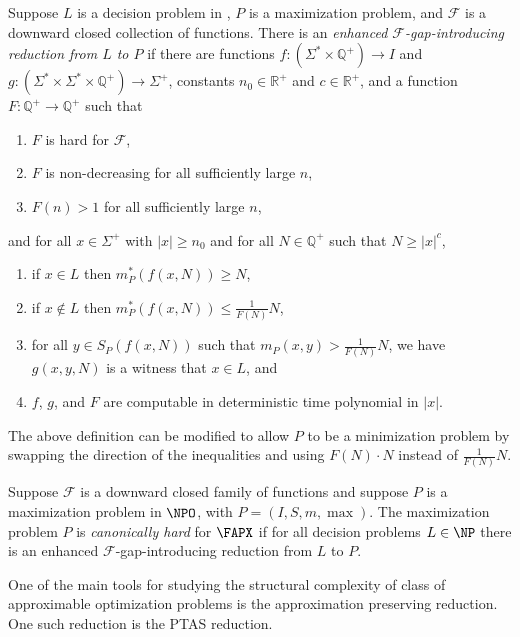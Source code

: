 \documentclass{article}
\begin{document}
\begin{definition}\label{def:gapintroducing}
  Suppose $L$ is a decision problem in \NP, $P$ is a maximization problem, and $\mathcal{F}$ is a downward closed collection of functions.
  There is an \emph{enhanced $\mathcal{F}$-gap-introducing reduction from $L$ to $P$} if there are functions $f \colon \left(\Sigma^* \times \mathbb{Q}^+ \right) \to I$ and $g \colon \left( \Sigma^* \times \Sigma^* \times \mathbb{Q}^+\right) \to \Sigma^+$, constants $n_0 \in \mathbb{R}^+$ and $c \in \mathbb{R}^+$, and a function $F \colon \mathbb{Q}^+ \to \mathbb{Q}^+$ such that
  \begin{enumerate}
  \item $F$ is hard for $\mathcal{F}$,
  \item $F$ is non-decreasing for all sufficiently large $n$,
  \item $F(n) > 1$ for all sufficiently large $n$,
  \end{enumerate}
  and for all $x \in \Sigma^+$ with $|x| \geq n_0$ and for all $N \in \mathbb{Q}^+$ such that $N \geq |x|^c$,
  \begin{enumerate}
  \item if $x \in L$ then $m_P^*(f(x, N)) \geq N$,
  \item if $x \notin L$ then $m_P^*(f(x, N)) \leq \frac{1}{F(N)} N$,
  \item for all $y \in S_P(f(x, N))$ such that $m_P(x, y) > \frac{1}{F(N)} N$, we have $g(x, y, N)$ is a witness that $x \in L$, and
  \item $f$, $g$, and $F$ are computable in deterministic time polynomial in $|x|$.
  \end{enumerate}
\end{definition}

The above definition can be modified to allow $P$ to be a minimization problem by swapping the direction of the inequalities and using $F(N) \cdot N$ instead of $\frac{1}{F(N)} N$.

\begin{definition}\label{def:canonicallyhard}
  Suppose $\mathcal{F}$ is a downward closed family of functions and suppose $P$ is a maximization problem in $\NPO$, with $P = (I, S, m, \max)$.
  The maximization problem $P$ is \emph{canonically hard} for $\FAPX$ if for all decision problems $L \in \NP$ there is an enhanced $\mathcal{F}$-gap-introducing reduction from $L$ to $P$.
\end{definition}

One of the main tools for studying the structural complexity of class of approximable optimization problems is the approximation preserving reduction.
One such reduction is the PTAS reduction.
\end{document}

